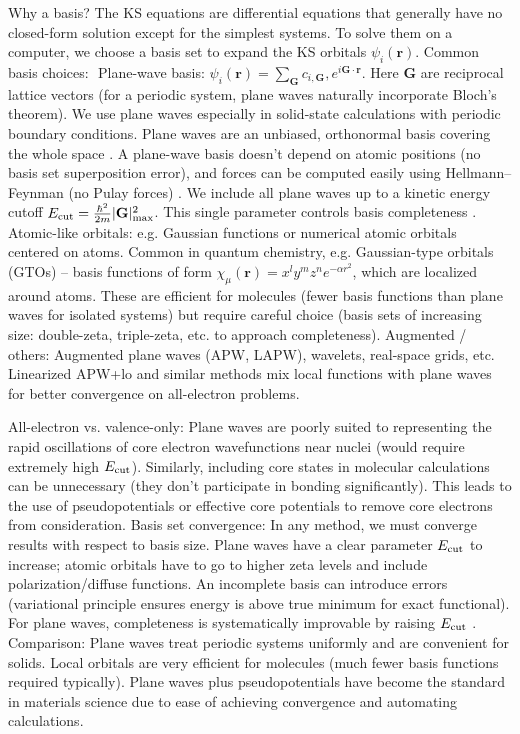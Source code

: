 Why a basis? The KS equations are differential equations that generally have no closed-form solution except for the simplest systems. To solve them on a computer, we choose a basis set to expand the KS orbitals $\psi_i(\mathbf{r})$. Common basis choices: 
Plane-wave basis: $\displaystyle \psi_i(\mathbf{r}) = \sum_{\mathbf{G}} c_{i,\mathbf{G}}, e^{i\mathbf{G}\cdot \mathbf{r}}$. Here $\mathbf{G}$ are reciprocal lattice vectors (for a periodic system, plane waves naturally incorporate Bloch’s theorem). We use plane waves especially in solid-state calculations with periodic boundary conditions. Plane waves are an unbiased, orthonormal basis covering the whole space  . A plane-wave basis doesn’t depend on atomic positions (no basis set superposition error), and forces can be computed easily using Hellmann–Feynman (no Pulay forces) . We include all plane waves up to a kinetic energy cutoff $E_{\rm cut} = \frac{\hbar^2}{2m}|\mathbf{G}|^2_{\max}$. This single parameter controls basis completeness .
Atomic-like orbitals: e.g. Gaussian functions or numerical atomic orbitals centered on atoms. Common in quantum chemistry, e.g. Gaussian-type orbitals (GTOs) – basis functions of form $\chi_{\mu}(\mathbf{r}) = x^l y^m z^n e^{-\alpha r^2}$, which are localized around atoms. These are efficient for molecules (fewer basis functions than plane waves for isolated systems) but require careful choice (basis sets of increasing size: double-zeta, triple-zeta, etc. to approach completeness).
Augmented / others: Augmented plane waves (APW, LAPW), wavelets, real-space grids, etc. Linearized APW+lo and similar methods mix local functions with plane waves for better convergence on all-electron problems.

All-electron vs. valence-only: Plane waves are poorly suited to representing the rapid oscillations of core electron wavefunctions near nuclei (would require extremely high $E_{\rm cut}$). Similarly, including core states in molecular calculations can be unnecessary (they don’t participate in bonding significantly). This leads to the use of pseudopotentials or effective core potentials to remove core electrons from consideration.
Basis set convergence: In any method, we must converge results with respect to basis size. Plane waves have a clear parameter $E_{\rm cut}$ to increase; atomic orbitals have to go to higher zeta levels and include polarization/diffuse functions. An incomplete basis can introduce errors (variational principle ensures energy is above true minimum for exact functional). For plane waves, completeness is systematically improvable by raising $E_{\rm cut}$ .
Comparison: Plane waves treat periodic systems uniformly and are convenient for solids. Local orbitals are very efficient for molecules (much fewer basis functions required typically). Plane waves plus pseudopotentials have become the standard in materials science due to ease of achieving convergence and automating calculations.

